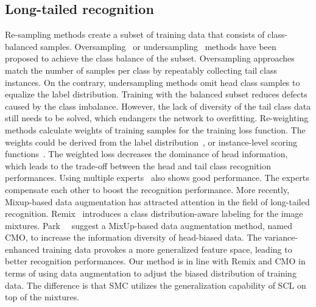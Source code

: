 \documentclass[10pt,twocolumn,letterpaper]{article}
\begin{document}
\subsection{Long-tailed recognition}
Re-sampling methods create a subset of training data that consists of class-balanced samples.
Oversampling~\cite{chawla2002smote, buda2018systematic} or undersampling~\cite{more2016survey, zhang2021bag} methods have been proposed to achieve the class balance of the subset.
Oversampling approaches match the number of samples per class by repeatably collecting tail class instances.
On the contrary, undersampling methods omit head class samples to equalize the label distribution.
Training with the balanced subset reduces defects caused by the class imbalance.
However, the lack of diversity of the tail class data still needs to be solved, which endangers the network to overfitting. Re-weighting methods calculate weights of training samples for the training loss function.
The weights could be derived from the label distribution~\cite{cao2019learning, cui2019class, ren2020balanced}, or instance-level scoring functions~\cite{lin2017focal, li2022equalized}.
The weighted loss decreases the dominance of head information, which leads to the trade-off between the head and tail class recognition performances.
Using multiple experts~\cite{RIDE, li2022trustworthy} also shows good performance. The experts compensate each other to boost the recognition performance.
More recently, Mixup-based data augmentation has attracted attention in the field of long-tailed recognition. Remix~\cite{chou2020remix} introduces a class distribution-aware labeling for the image mixtures. Park~\etal~\cite{CMO} suggest a MixUp-based data augmentation method, named CMO, to increase the information diversity of head-biased data. The variance-enhanced training data provokes a more generalized feature space, leading to better recognition performances.
Our method is in line with Remix and CMO in terms of using data augmentation to adjust the biased distribution of training data. The difference is that SMC utilizes the generalization capability of SCL on top of the mixtures.
\end{document}
